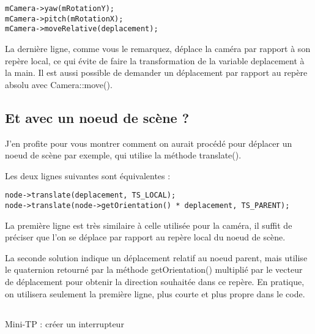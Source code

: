 \documentclass[10pt,a4paper]{report}
\begin{document}
\begin{lstlisting}[caption={}]
mCamera->yaw(mRotationY);
mCamera->pitch(mRotationX);
mCamera->moveRelative(deplacement);
\end{lstlisting}

La derni\`ere ligne, comme vous le remarquez, d\'eplace la cam\'era par rapport \`a son rep\`ere local, ce qui \'evite de faire la transformation de la variable deplacement \`a la main. Il est aussi possible de demander un d\'eplacement par rapport au rep\`ere absolu avec Camera::move().


















\subsection{Et avec un noeud de sc\`ene ?}

J'en profite pour vous montrer comment on aurait proc\'ed\'e pour d\'eplacer un noeud de sc\`ene par exemple, qui utilise la m\'ethode translate().

Les deux lignes suivantes sont \'equivalentes :


\begin{lstlisting}[caption={}]
node->translate(deplacement, TS_LOCAL);
node->translate(node->getOrientation() * deplacement, TS_PARENT);
\end{lstlisting}


La premi\`ere ligne est tr\`es similaire \`a celle utilis\'ee pour la cam\'era, il suffit de pr\'eciser que l'on se d\'eplace par rapport au rep\`ere local du noeud de sc\`ene.

La seconde solution indique un d\'eplacement relatif au noeud parent, mais utilise le quaternion retourn\'e par la m\'ethode getOrientation() multipli\'e par le vecteur de d\'eplacement pour obtenir la direction souhait\'ee dans ce rep\`ere. En pratique, on utilisera seulement la premi\`ere ligne, plus courte et plus propre dans le code.







\subsection{}
Mini-TP : cr\'eer un interrupteur
\end{document}
